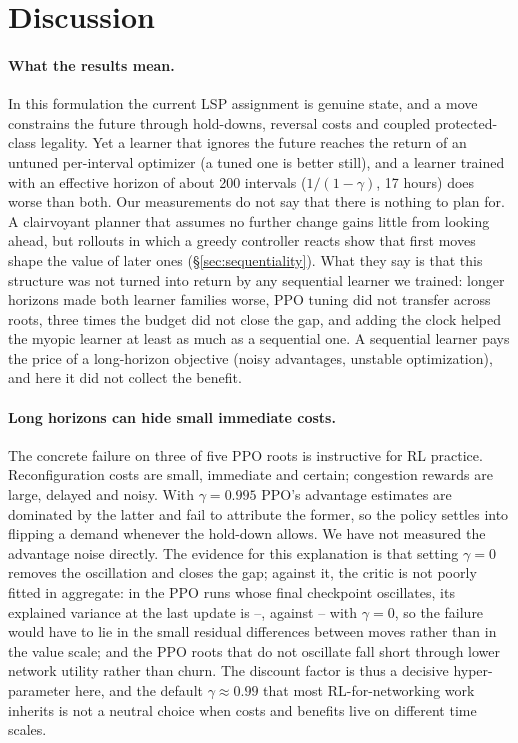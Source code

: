 \section{Discussion}
\label{sec:discussion}

\paragraph{What the results mean.} In this formulation the current LSP
assignment is genuine state, and a move constrains the future through
hold-downs, reversal costs and coupled protected-class legality. Yet a learner
that ignores the future reaches the return of an untuned per-interval
optimizer (a tuned one is better still), and a
learner trained with an effective horizon of about 200 intervals
($1/(1-\gamma)$, 17 hours) does worse than both. Our measurements do not
say that there is nothing to plan for. A clairvoyant planner that assumes no
further change gains little from looking ahead, but rollouts in which a
greedy controller reacts show that first moves shape the value of later ones
(\S\ref{sec:sequentiality}). What they say is that this structure was not
turned into return by any sequential learner we trained: longer horizons made
both learner families worse, PPO tuning did not transfer across roots, three
times the budget did not close the gap, and adding the clock helped the myopic
learner at least as much as a sequential one. A sequential learner pays the
price of a long-horizon objective (noisy advantages, unstable optimization),
and here it did not collect the benefit.

\paragraph{Long horizons can hide small immediate costs.} The concrete failure
on three of five PPO roots is instructive for RL practice. Reconfiguration costs are small, immediate and
certain; congestion rewards are large, delayed and noisy. With $\gamma=0.995$
PPO's advantage estimates are dominated by the latter and fail to attribute
the former, so the policy settles into flipping a demand whenever the
hold-down allows. We have not measured the advantage noise directly. The
evidence for this explanation is that setting $\gamma=0$ removes the
oscillation and closes the gap; against it, the critic is not poorly fitted
in aggregate: in the \PPOEVOscRuns{} PPO runs whose final checkpoint
oscillates, its explained variance at the last update is
\PPOEVOscMin--\PPOEVOscMax{}, against \PPOEVZeroMin--\PPOEVZeroMax{} with
$\gamma=0$, so the failure would have to
lie in the small residual differences between moves rather than in the value
scale; and the PPO roots that do not oscillate fall short through lower network utility
rather than churn. The discount factor is thus a decisive hyper-parameter here, and the
default $\gamma\approx0.99$ that most RL-for-networking work inherits is not a
neutral choice when costs and benefits live on different time scales.

